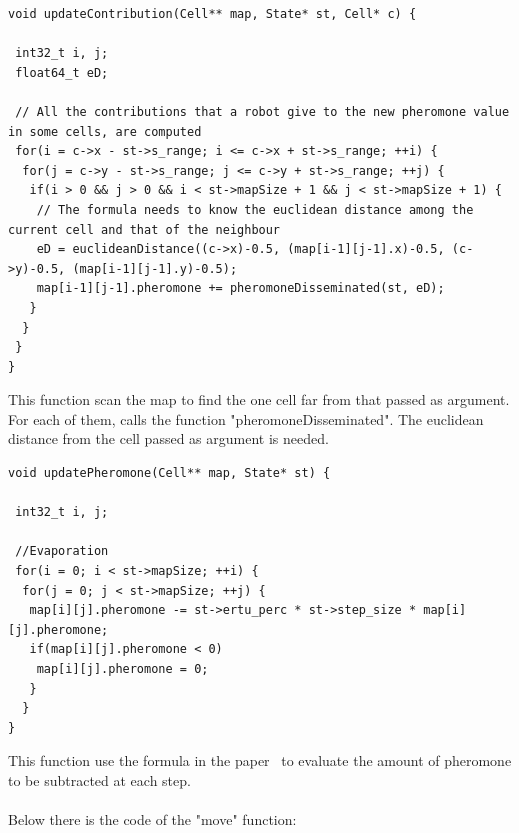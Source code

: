 \documentclass[english]{article}
\begin{document}
\begin{lstlisting}
void updateContribution(Cell** map, State* st, Cell* c) {

 int32_t i, j;
 float64_t eD;

 // All the contributions that a robot give to the new pheromone value in some cells, are computed
 for(i = c->x - st->s_range; i <= c->x + st->s_range; ++i) {
  for(j = c->y - st->s_range; j <= c->y + st->s_range; ++j) {
   if(i > 0 && j > 0 && i < st->mapSize + 1 && j < st->mapSize + 1) {
    // The formula needs to know the euclidean distance among the current cell and that of the neighbour
    eD = euclideanDistance((c->x)-0.5, (map[i-1][j-1].x)-0.5, (c->y)-0.5, (map[i-1][j-1].y)-0.5);
    map[i-1][j-1].pheromone += pheromoneDisseminated(st, eD);
   }
  }
 }
}
\end{lstlisting}

\noindent This function scan the map to find the one cell far from that passed as argument. For each of them, calls the function "pheromoneDisseminated". The euclidean distance from the cell passed as argument is needed.

\begin{lstlisting}
void updatePheromone(Cell** map, State* st) {

 int32_t i, j;

 //Evaporation
 for(i = 0; i < st->mapSize; ++i) {
  for(j = 0; j < st->mapSize; ++j) {
   map[i][j].pheromone -= st->ertu_perc * st->step_size * map[i][j].pheromone;
   if(map[i][j].pheromone < 0)
    map[i][j].pheromone = 0;
   }
  }
}
\end{lstlisting}
 
\noindent This function use the formula in the paper~\cite{AlgorithmPaper} to evaluate the amount of pheromone to be subtracted at each step.\\
\\Below there is the code of the "move" function:  
\end{document}
